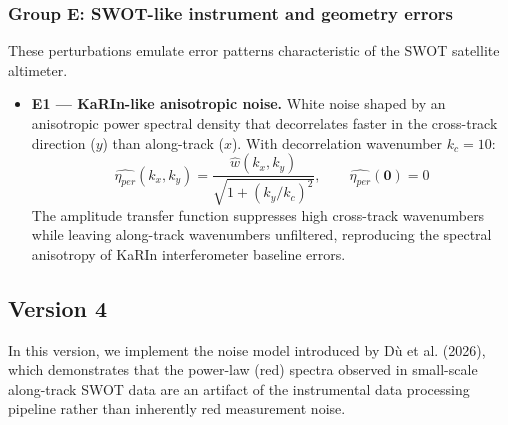 \documentclass[../SQG_notes.tex]{subfiles}
\begin{document}
    \subsubsection{Group E: SWOT-like instrument and geometry errors}
    These perturbations emulate error patterns characteristic of the SWOT satellite altimeter.
    \begin{itemize}
        \item \textbf{E1 --- KaRIn-like anisotropic noise.} White noise shaped by an anisotropic power spectral density that decorrelates faster in the cross-track direction ($y$) than along-track ($x$). With decorrelation wavenumber $k_c = 10$:
        \[ \hat{\eta_{per}}(k_x, k_y) = \frac{\hat{w}(k_x, k_y)}{\sqrt{1 + (k_y / k_c)^2}}, \qquad \hat{\eta_{per}}(\mathbf{0}) = 0 \]
        The amplitude transfer function suppresses high cross-track wavenumbers while leaving along-track wavenumbers unfiltered, reproducing the spectral anisotropy of KaRIn interferometer baseline errors.

    \end{itemize}

    \subsection{Version 4}
    In this version, we implement the noise model introduced by D\`u et al. (2026), which demonstrates that the power-law (red) spectra observed in small-scale along-track SWOT data are an artifact of the instrumental data processing pipeline rather than inherently red measurement noise. 
    
\end{document}
